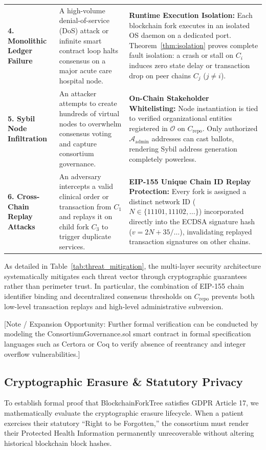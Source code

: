 \begin{table}[t]
\begin{tabularx}{\textwidth}{p{3.2cm}p{4.4cm}X}
\addlinespace
\textbf{4. Monolithic Ledger Failure} & A high-volume denial-of-service (DoS) attack or infinite smart contract loop halts consensus on a major acute care hospital node. & \textbf{Runtime Execution Isolation:} Each blockchain fork executes in an isolated OS daemon on a dedicated port. Theorem~\ref{thm:isolation} proves complete fault isolation: a crash or stall on $C_i$ induces zero state delay or transaction drop on peer chains $C_j$ ($j \neq i$). \\
\addlinespace
\textbf{5. Sybil Node Infiltration} & An attacker attempts to create hundreds of virtual nodes to overwhelm consensus voting and capture consortium governance. & \textbf{On-Chain Stakeholder Whitelisting:} Node instantiation is tied to verified organizational entities registered in $\mathcal{O}$ on $C_{\text{repo}}$. Only authorized $\mathcal{A}_{\text{admin}}$ addresses can cast ballots, rendering Sybil address generation completely powerless. \\
\addlinespace
\textbf{6. Cross-Chain Replay Attacks} & An adversary intercepts a valid clinical order or transaction from $C_1$ and replays it on child fork $C_3$ to trigger duplicate services. & \textbf{EIP-155 Unique Chain ID Replay Protection:} Every fork is assigned a distinct network ID ($N \in \{11101, 11102, \dots\}$) incorporated directly into the ECDSA signature hash ($v = 2N + 35/\dots$), invalidating replayed transaction signatures on other chains. \\
\bottomrule
\end{tabularx}
\end{table}

As detailed in Table~\ref{tab:threat_mitigation}, the multi-layer security architecture systematically mitigates each threat vector through cryptographic guarantees rather than perimeter trust. In particular, the combination of EIP-155 chain identifier binding and decentralized consensus thresholds on $C_{\text{repo}}$ prevents both low-level transaction replays and high-level administrative subversion.

[Note / Expansion Opportunity: Further formal verification can be conducted by modeling the ConsortiumGovernance.sol smart contract in formal specification languages such as Certora or Coq to verify absence of reentrancy and integer overflow vulnerabilities.]

\subsection{Cryptographic Erasure \& Statutory Privacy}
To establish formal proof that BlockchainForkTree satisfies GDPR Article 17, we mathematically evaluate the cryptographic erasure lifecycle. When a patient exercises their statutory ``Right to be Forgotten,'' the consortium must render their Protected Health Information permanently unrecoverable without altering historical blockchain block hashes.

